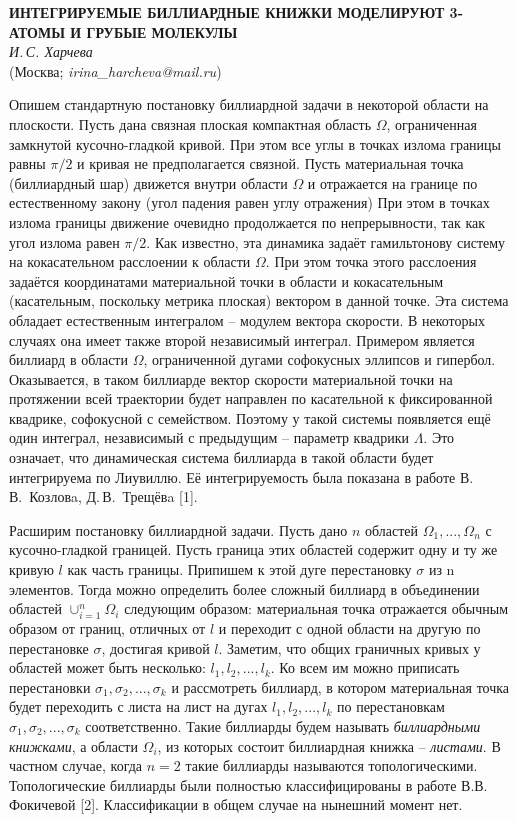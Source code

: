 \begin{center}{ \bf ИНТЕГРИРУЕМЫЕ БИЛЛИАРДНЫЕ КНИЖКИ МОДЕЛИРУЮТ 3-АТОМЫ И ГРУБЫЕ МОЛЕКУЛЫ}\\
{\it И.\,С. Харчева } \\
(Москва; {\it irina\_harcheva@mail.ru})
\end{center}


Опишем стандартную постановку биллиардной задачи в некоторой области на плоскости. Пусть дана связная плоская компактная область $\Omega$, ограниченная замкнутой кусочно-гладкой кривой. При этом все углы в точках излома границы равны $\pi/2$ и кривая не предполагается связной.
Пусть материальная точка (биллиардный шар) движется внутри области $\Omega$ и отражается на границе по естественному закону
(угол падения равен углу отражения) При этом в точках излома границы движение очевидно продолжается по непрерывности, так как угол излома равен $ \pi/2 $.
Как известно, эта динамика задаёт гамильтонову систему на кокасательном расслоении к области $\Omega$.  При этом точка этого расслоения задаётся координатами материальной точки в области и кокасательным (касательным, поскольку метрика плоская) вектором в данной точке.
Эта система обладает естественным интегралом -- модулем вектора скорости. В некоторых случаях она имеет также
второй независимый интеграл. Примером является биллиард в области $\Omega$, ограниченной дугами софокусных эллипсов и гипербол. Оказывается, в таком биллиарде вектор скорости материальной точки на протяжении всей траектории будет направлен по касательной к фиксированной квадрике, софокусной с семейством. Поэтому у такой системы появляется ещё один интеграл, независимый с предыдущим -- параметр квадрики $ \Lambda $. Это означает, что динамическая система биллиарда в такой области будет интегрируема по Лиувиллю. Её интегрируемость была показана в работе В.\,В.~Козловa, Д.\,В.~Трещёвa [1].

Расширим постановку биллиардной задачи. Пусть дано $n$ областей $\Omega_1, ... ,\Omega_n$ с кусочно-гладкой границей.
Пусть граница этих областей содержит одну и ту же кривую $l$ как часть границы. Припишем к этой дуге перестановку $ \sigma $ из n элементов. Тогда можно определить более сложный биллиард в объединении областей $\cup_{i = 1}^n \Omega_i$ следующим образом: материальная точка отражается обычным образом от границ, отличных от $l$ и переходит с одной области на другую по перестановке $ \sigma $, достигая кривой $l$. Заметим, что общих граничных кривых у областей может быть несколько: $ l_1, l_2, ..., l_k $. Ко всем им можно приписать перестановки $ \sigma_1, \sigma_2, ..., \sigma_k $  и рассмотреть биллиард, в котором материальная точка будет переходить с листа на лист на дугах $ l_1, l_2, ..., l_k $ по перестановкам $ \sigma_1, \sigma_2, ..., \sigma_k $ соответственно. Такие биллиарды будем называть \textit{биллиардными книжками}, а области $ \Omega_i $,  из которых состоит биллиардная книжка -- \textit{листами}. В частном случае, когда $ n = 2 $ такие биллиарды называются топологическими. Топологические биллиарды были полностью классифицированы в работе В.В.\,Фокичевой [2]. Классификации в общем случае на нынешний момент нет.

